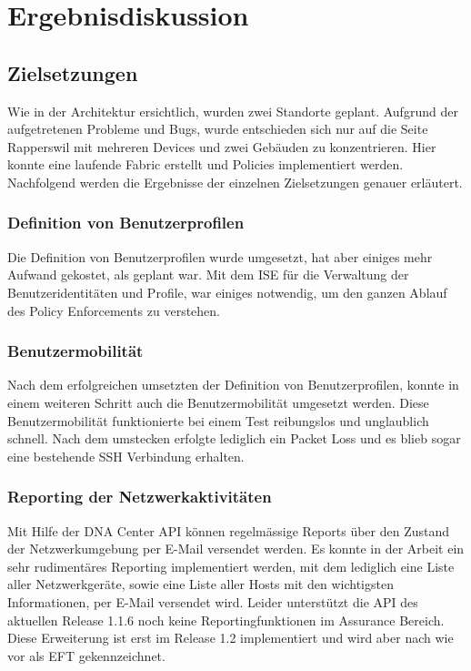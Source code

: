 \section{Ergebnisdiskussion}



\subsection{Zielsetzungen}
Wie in der Architektur ersichtlich, wurden zwei Standorte geplant. Aufgrund der aufgetretenen Probleme und Bugs, wurde entschieden sich nur auf die Seite Rapperswil mit mehreren Devices und zwei Gebäuden zu konzentrieren. Hier konnte eine laufende Fabric erstellt und Policies implementiert werden. Nachfolgend werden die Ergebnisse der einzelnen Zielsetzungen genauer erläutert.

\subsubsection{Definition von Benutzerprofilen}
Die Definition von Benutzerprofilen wurde umgesetzt, hat aber einiges mehr Aufwand gekostet, als geplant war. Mit dem ISE für die Verwaltung der Benutzeridentitäten und Profile, war einiges notwendig, um den ganzen Ablauf des Policy Enforcements zu verstehen.

\subsubsection{Benutzermobilität}
Nach dem erfolgreichen umsetzten der Definition von Benutzerprofilen, konnte in einem weiteren Schritt auch die Benutzermobilität umgesetzt werden. Diese Benutzermobilität funktionierte bei einem Test reibungslos und unglaublich schnell. Nach dem umstecken erfolgte lediglich ein Packet Loss und es blieb sogar eine bestehende SSH Verbindung erhalten. 


\subsubsection{Reporting der Netzwerkaktivitäten}
Mit Hilfe der DNA Center API können regelmässige Reports über den Zustand der Netzwerkumgebung per E-Mail versendet werden. Es konnte in der Arbeit ein sehr rudimentäres Reporting implementiert werden, mit dem lediglich eine Liste aller Netzwerkgeräte, sowie eine Liste aller Hosts mit den wichtigsten Informationen, per E-Mail versendet wird. Leider unterstützt die API des aktuellen Release 1.1.6 noch keine Reportingfunktionen im Assurance Bereich. Diese Erweiterung ist erst im Release 1.2 implementiert und wird aber nach wie vor als EFT gekennzeichnet.

